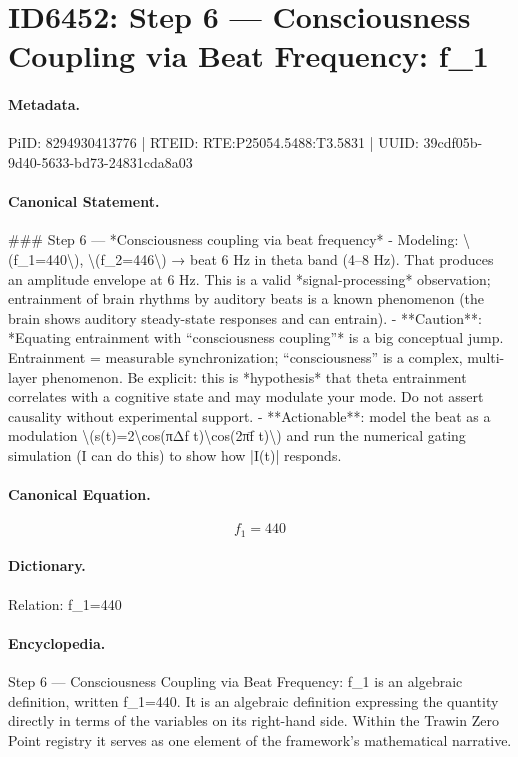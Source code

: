 \section*{ID6452: Step 6 — Consciousness Coupling via Beat Frequency: f\_1}
\paragraph{Metadata.}
PiID: 8294930413776 | RTEID: RTE:P25054.5488:T3.5831 | UUID: 39cdf05b-9d40-5633-bd73-24831cda8a03

\paragraph{Canonical Statement.}
\#\#\# Step 6 — *Consciousness coupling via beat frequency* - Modeling: \textbackslash{}(f\_1=440\textbackslash{}), \textbackslash{}(f\_2=446\textbackslash{}) → beat 6 Hz in theta band (4–8 Hz). That produces an amplitude envelope at 6 Hz. This is a valid *signal-processing* observation; entrainment of brain rhythms by auditory beats is a known phenomenon (the brain shows auditory steady-state responses and can entrain). - **Caution**: *Equating entrainment with “consciousness coupling”* is a big conceptual jump. Entrainment = measurable synchronization; “consciousness” is a complex, multi-layer phenomenon. Be explicit: this is *hypothesis* that theta entrainment correlates with a cognitive state and may modulate your mode. Do not assert causality without experimental support. - **Actionable**: model the beat as a modulation \textbackslash{}(s(t)=2\textbackslash{}cos(πΔf t)\textbackslash{}cos(2πf̄ t)\textbackslash{}) and run the numerical gating simulation (I can do this) to show how |I(t)| responds.

\paragraph{Canonical Equation.}
\[
f_1=440
\]

\paragraph{Dictionary.}
Relation: f\_1=440

\paragraph{Encyclopedia.}
Step 6 — Consciousness Coupling via Beat Frequency: f\_1 is an algebraic definition, written f\_1=440. It is an algebraic definition expressing the quantity directly in terms of the variables on its right-hand side. Within the Trawin Zero Point registry it serves as one element of the framework's mathematical narrative.
